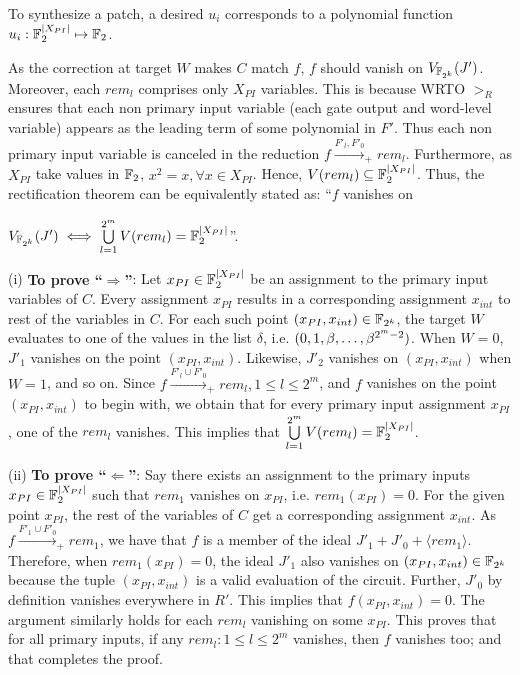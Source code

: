 {\red
To synthesize a patch, a desired $u_i$ corresponds
to a polynomial function $u_i:{\mathbb{F}}_2^{|X_{PI}|} \mapsto {\mathbb{F}}_2$. 
\begin{Proof}
As the correction at target $W$ makes $C$ match $f$, $f$ should vanish on
$V_{{\mathbb{F}}_{2^k}}(J')$.
Moreover, each $rem_l$ comprises only $X_{PI}$ variables. This is
because WRTO $>_R$ ensures that each non primary input variable (each gate
output and  word-level variable) appears as the leading term of some
polynomial in $F'$. Thus each non primary input variable is canceled
in the reduction $f\xrightarrow{F'_l, F'_{0}}_+ rem_l$. Furthermore,
as $X_{PI}$ take values in ${\mathbb{F}}_2$, $x^2=x, \forall x \in
X_{PI}$. Hence, 
$V(rem_l) \subseteq {\mathbb{F}}_{2}^{|X_{PI}|}$. Thus, the rectification theorem
 can be equivalently stated as: ``$f$ vanishes on
\begin{small}
$V_{{\mathbb{F}}_{2^k}}(J') \iff \bigcup\limits_{l=1}^{2^m}V(rem_l) = {\mathbb{F}}_{2}^{|X_{PI}|}$''.
\end{small} 

(i) {\bf To prove ``$\Rightarrow$''}: Let $x_{PI} \in {\mathbb{F}}_{2}^{|X_{PI}|}$ be an
assignment to the primary input variables of $C$. Every assignment
$x_{PI}$ results in a corresponding assignment $x_{int}$ 
to rest of the variables in $C$. For each such point $(x_{PI},x_{int})\in {\mathbb{F}}_{2^k}$,
the target $W$ evaluates to one of the values in the list $\delta$,
i.e. $(0,1,\beta,\dots,\beta^{2^m-2})$. When $W = 0$, $J'_1$ vanishes on
the point $(x_{PI},x_{int})$. Likewise, $J'_2$ vanishes on
$(x_{PI},x_{int})$ when $W = 1$, and so on. Since
$f\xrightarrow{F'_l\cup F'_0}_+rem_l,1 \leq l \leq 2^m$, and $f$ vanishes
on the point $(x_{PI},x_{int})$ to begin with, we obtain that for
every  primary input assignment $x_{PI}$, one of the $rem_l$ vanishes. This
implies that $ \bigcup\limits_{l=1}^{2^m}V(rem_l) = {\mathbb{F}}_{2}^{|X_{PI}|}$.

(ii) {\bf To prove ``$\Leftarrow$''}: Say there exists an assignment to the
primary inputs $x_{PI} \in {\mathbb{F}}_{2}^{|X_{PI}|}$ such that $rem_1$ vanishes on
$x_{PI}$, i.e. $rem_1(x_{PI})=0$. For the given point $x_{PI}$, the rest of the variables 
of $C$ get a corresponding assignment $x_{int}$. 
As $f\xrightarrow{F'_1\cup F'_0}_+ rem_1$, we have that $f$ is a member of the
ideal $J'_1 + J'_0 + \langle rem_1 \rangle$. Therefore, when
$rem_1(x_{PI})=0$, the ideal $J'_1$ also vanishes on $(x_{PI},x_{int}) \in {\mathbb{F}}_{2^k}$
because the tuple $(x_{PI},x_{int})$ is a valid evaluation of the circuit.
Further, $J'_0$ by definition vanishes everywhere in $R'$. This implies that
$f(x_{PI},x_{int})=0$. The argument similarly holds for each
$rem_{l}$ vanishing on some $x_{PI}$. This proves that for all primary
inputs, if any $rem_l:1 \leq l \leq 2^m$ vanishes, then $f$ vanishes too; and 
that completes the proof.
\end{Proof}
 }

